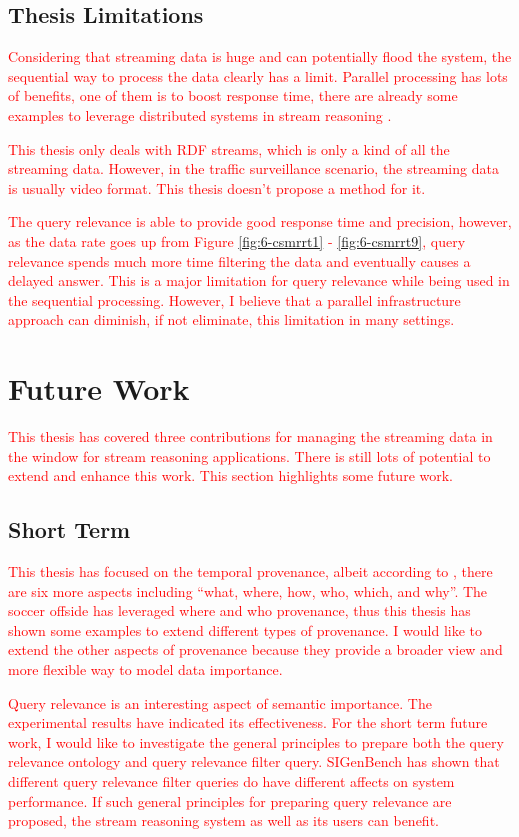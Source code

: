 \subsection{Thesis Limitations}
\textcolor{red}{
Considering that streaming data is huge and can potentially flood the system, the sequential way to process the data clearly has a limit. 
Parallel processing has lots of benefits, one of them is to boost response time, there are already some examples to leverage distributed systems in stream reasoning \cite{hoeksema2011high} \cite{liu2014efficient}. 
}

\textcolor{red}{
This thesis only deals with RDF streams, which is only a kind of all the streaming data.
However, in the traffic surveillance scenario, the streaming data is usually video format. 
This thesis doesn't propose a method for it. 
}

\textcolor{red}{
The query relevance is able to provide good response time and precision, however, as the data rate goes up from Figure \ref{fig:6-csmrrt1} - \ref{fig:6-csmrrt9}, query relevance spends much more time filtering the data and eventually causes a delayed answer. 
This is a major limitation for query relevance while being used in the sequential processing. 
However, I believe that a parallel infrastructure approach can diminish, if not eliminate, this limitation in many settings.
}
%
\section{Future Work}
\textcolor{red}{
This thesis has covered three contributions for managing the streaming data in the window for stream reasoning applications.
There 
is still lots of potential to extend and enhance this work. 
This section highlights some future work.
}
%
\subsection{Short Term}
\textcolor{red}{
This thesis has focused on the temporal provenance, albeit according to \cite{ram2009new}, there are six more aspects including ``what, where, how, who, which, and why''.
The soccer offside has leveraged where and who provenance, thus this thesis has shown some examples to extend different types of provenance.
I would like to extend the other aspects of provenance because they provide a broader view and more flexible way to model data importance.
}

\textcolor{red}{
Query relevance is an interesting aspect of semantic importance.
The experimental results have indicated its effectiveness. 
For the short term future work, I would like to investigate the general principles to prepare both the query relevance ontology and query relevance filter query. 
SIGenBench has shown that different query relevance filter queries do have different affects on system performance. 
If such general principles for preparing query relevance are proposed, the stream reasoning system as well as its users can benefit.
}
%
